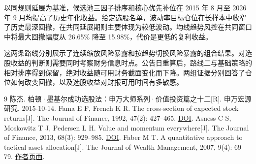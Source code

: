 以同规则延展为基准，候选池三因子排序和核心优先补位在 2015 年 8 月至 2026 年 9 月均提高了历史年化收益。给定选股名单，波动率目标仓位在长样本中收窄了历史最深回撤，在共同延展期则主要体现为较低波动。均线趋势风控在共同窗口中将最大回撤幅度从 26.65\% 降至 15.98\%，代价是更低的复利收益。

这两条路线分别展示了连续缩放风险暴露和按趋势切换风险暴露的组合结果。对选股收益的判断则需要同时考察财务信息时点。公告日重算后，路线二与基础策略的相对排序得到保留，绝对收益随可用财务截面变化而下降。两组证据分别回答了仓位如何改变回撤，以及选股收益对财报可用时间有多敏感。

\renewcommand{\bibname}{参考文献}
{\let\chapter\section
\begin{thebibliography}{9}
 陈杰. 柏顿·墨基尔成功选股法：申万大师系列·价值投资篇之十二[R]. 申万宏源研究, 2015-10-14.
 Fama E F, French K R. The cross-section of expected stock returns[J]. The Journal of Finance, 1992, 47(2): 427--465. \href{https://doi.org/10.1111/j.1540-6261.1992.tb04398.x}{DOI}.
 Asness C S, Moskowitz T J, Pedersen L H. Value and momentum everywhere[J]. The Journal of Finance, 2013, 68(3): 929--985. \href{https://doi.org/10.1111/jofi.12021}{DOI}.
 Faber M T. A quantitative approach to tactical asset allocation[J]. The Journal of Wealth Management, 2007, 9(4): 69--79. \href{https://mebfaber.com/2009/02/19/a-quantitative-approach-to-tactical-asset-allocation-updated/}{作者页面}.
\end{thebibliography}}
